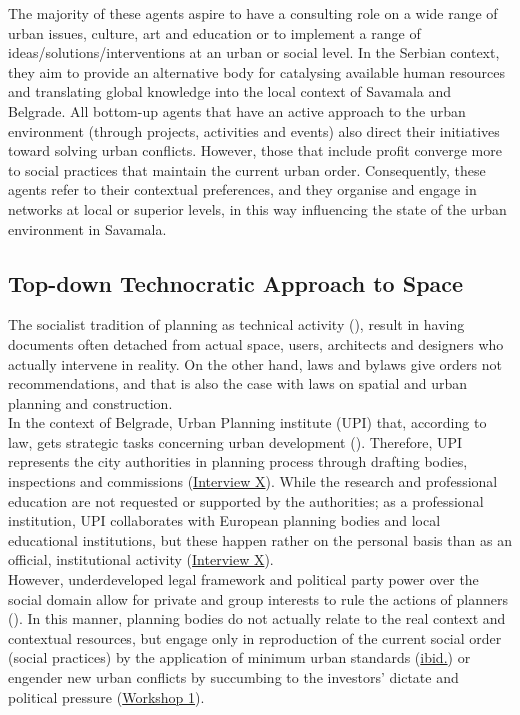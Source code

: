 \documentclass[11pt]{report}
\begin{document}
The majority of these agents aspire to have a consulting role on a wide range of urban issues, culture, art and education or to implement a range of ideas/solutions/interventions at an urban or social level.
In the Serbian context, they aim to provide an alternative body for catalysing available human resources and translating global knowledge into the local context of Savamala and Belgrade.
All bottom-up agents that have an active approach to the urban environment (through projects, activities and events) also direct their initiatives toward solving urban conflicts. However, those that include profit converge more to social practices that maintain the current urban order.
Consequently, these agents refer to their contextual preferences, and they organise and engage in networks at local or superior levels, in this way influencing the state of the urban environment in Savamala.
    
\subsection{Top-down Technocratic Approach to Space}

The socialist tradition of planning as technical activity (\href{ref}{\citealt{vujosevic_planning_2006}}), result in having documents often detached from actual space, users, architects and designers who actually intervene in reality.
On the other hand, laws and bylaws give orders not recommendations, and 
that is also the case with laws on spatial and urban planning and construction.
\\

In the context of Belgrade, Urban Planning institute (UPI) that, according to law, gets strategic tasks concerning urban development (\cite{PCA}).
Therefore, UPI represents the city authorities in planning process through drafting bodies, inspections and commissions (\href{InterviewX}{Interview X}).
While the research and professional education are not requested or supported by the authorities; as a professional institution, UPI collaborates with European planning bodies and local educational institutions, but these happen rather on the personal basis than as an official, institutional activity
(\href{InterviewX}{Interview X}).
\\

However, underdeveloped legal framework and political party power over the social domain allow for private and group interests to rule the actions of planners (\href{ref}{\citealt{vujovic_belgrades_2007}}).
In this manner, planning bodies do not actually relate to the real context and contextual resources, but engage only in reproduction of the current social order (social practices) by the application of minimum urban standards (\href{Vujovic}{ibid.}) or engender new urban conflicts by succumbing to the investors' dictate and political pressure
(\href{Expert Workshop}{Workshop 1}).
\\
\end{document}
